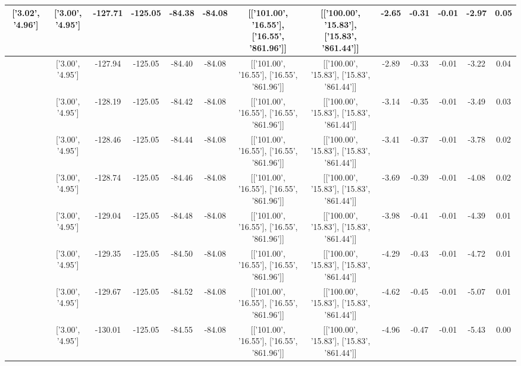 \begin{table}[htbp]
\begin{adjustbox}{angle=90}
\begin{tabular}{|c|c|c|c|c|c|c|c|c|c|c|c|c|}
 ['3.02', '4.96'] & ['3.00', '4.95'] & -127.71 & -125.05 & -84.38 & -84.08 & [['101.00', '16.55'], ['16.55', '861.96']] & [['100.00', '15.83'], ['15.83', '861.44']] & -2.65 & -0.31 & -0.01 & -2.97 & 0.05\\ \hline
 ['3.02', '4.96'] & ['3.00', '4.95'] & -127.94 & -125.05 & -84.40 & -84.08 & [['101.00', '16.55'], ['16.55', '861.96']] & [['100.00', '15.83'], ['15.83', '861.44']] & -2.89 & -0.33 & -0.01 & -3.22 & 0.04\\ \hline
 ['3.02', '4.96'] & ['3.00', '4.95'] & -128.19 & -125.05 & -84.42 & -84.08 & [['101.00', '16.55'], ['16.55', '861.96']] & [['100.00', '15.83'], ['15.83', '861.44']] & -3.14 & -0.35 & -0.01 & -3.49 & 0.03\\ \hline
 ['3.02', '4.96'] & ['3.00', '4.95'] & -128.46 & -125.05 & -84.44 & -84.08 & [['101.00', '16.55'], ['16.55', '861.96']] & [['100.00', '15.83'], ['15.83', '861.44']] & -3.41 & -0.37 & -0.01 & -3.78 & 0.02\\ \hline
 ['3.02', '4.96'] & ['3.00', '4.95'] & -128.74 & -125.05 & -84.46 & -84.08 & [['101.00', '16.55'], ['16.55', '861.96']] & [['100.00', '15.83'], ['15.83', '861.44']] & -3.69 & -0.39 & -0.01 & -4.08 & 0.02\\ \hline
 ['3.02', '4.96'] & ['3.00', '4.95'] & -129.04 & -125.05 & -84.48 & -84.08 & [['101.00', '16.55'], ['16.55', '861.96']] & [['100.00', '15.83'], ['15.83', '861.44']] & -3.98 & -0.41 & -0.01 & -4.39 & 0.01\\ \hline
 ['3.03', '4.96'] & ['3.00', '4.95'] & -129.35 & -125.05 & -84.50 & -84.08 & [['101.00', '16.55'], ['16.55', '861.96']] & [['100.00', '15.83'], ['15.83', '861.44']] & -4.29 & -0.43 & -0.01 & -4.72 & 0.01\\ \hline
 ['3.03', '4.96'] & ['3.00', '4.95'] & -129.67 & -125.05 & -84.52 & -84.08 & [['101.00', '16.55'], ['16.55', '861.96']] & [['100.00', '15.83'], ['15.83', '861.44']] & -4.62 & -0.45 & -0.01 & -5.07 & 0.01\\ \hline
 ['3.03', '4.96'] & ['3.00', '4.95'] & -130.01 & -125.05 & -84.55 & -84.08 & [['101.00', '16.55'], ['16.55', '861.96']] & [['100.00', '15.83'], ['15.83', '861.44']] & -4.96 & -0.47 & -0.01 & -5.43 & 0.00\\ \hline
            \end{tabular}
        \end{adjustbox}
        \caption{}
        \label{}
    \end{table}
    